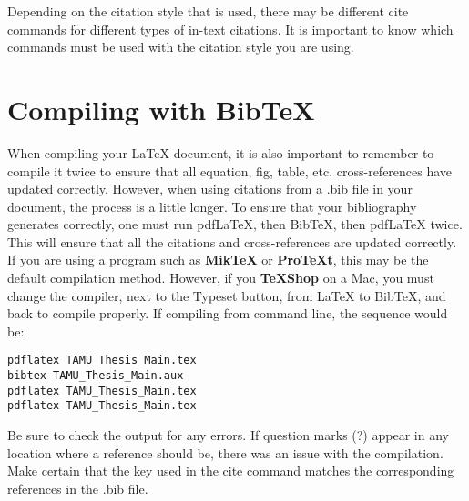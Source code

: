 Depending on the citation style that is used, there may be different cite commands for different types of in-text citations. It is important to know which commands must be used with the citation style you are using.

\section{Compiling with \textbf{BibTeX}}
When compiling your \LaTeX{} document, it is also important to remember to compile it twice to ensure that all equation, fig, table, etc. cross-references have updated correctly. However, when using citations from a .bib file in your document, the process is a little longer. To ensure that your bibliography generates correctly, one must run pdfLaTeX, then BibTeX, then pdfLaTeX twice. This will ensure that all the citations and cross-references are updated correctly. If you are using a program such as \textbf{MikTeX} or \textbf{ProTeXt}, this may be the default compilation method. However, if you \textbf{TeXShop} on a Mac, you must change the compiler, next to the Typeset button, from LaTeX to BibTeX, and back to compile properly. If compiling from command line, the sequence would be:

{\footnotesize \begin{verbatim}
pdflatex TAMU_Thesis_Main.tex
bibtex TAMU_Thesis_Main.aux
pdflatex TAMU_Thesis_Main.tex
pdflatex TAMU_Thesis_Main.tex
\end{verbatim}}

Be sure to check the output for any errors. If question marks (?) appear in any location where a reference should be, there was an issue with the compilation. Make certain that the key used in the cite command matches the corresponding references in the .bib file.
